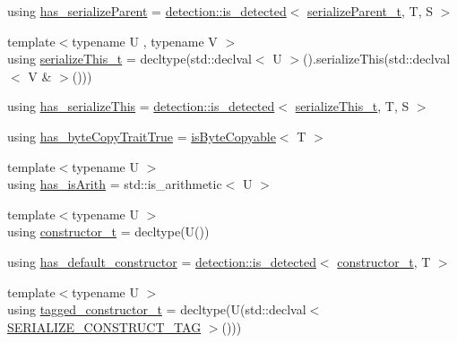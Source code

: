 \begin{DoxyCompactItemize}
\item 
using \hyperlink{structcheckpoint_1_1_serializable_traits_a4785b7f54369ec889ac5a25a8256a578}{has\+\_\+serialize\+Parent} = \hyperlink{namespacedetection_a30893549a3de1e9603d78dad6d5dce92}{detection\+::is\+\_\+detected}$<$ \hyperlink{structcheckpoint_1_1_serializable_traits_a38585e5b9aa0653c08ff48504e922ad5}{serialize\+Parent\+\_\+t}, T, S $>$
\item 
{\footnotesize template$<$typename U , typename V $>$ }\\using \hyperlink{structcheckpoint_1_1_serializable_traits_ac81eb64532a65d97dc995e582ef708ad}{serialize\+This\+\_\+t} = decltype(std\+::declval$<$ U $>$().serialize\+This(std\+::declval$<$ V \& $>$()))
\item 
using \hyperlink{structcheckpoint_1_1_serializable_traits_adc99520813c22cf61ab70ba2fea3cdc6}{has\+\_\+serialize\+This} = \hyperlink{namespacedetection_a30893549a3de1e9603d78dad6d5dce92}{detection\+::is\+\_\+detected}$<$ \hyperlink{structcheckpoint_1_1_serializable_traits_ac81eb64532a65d97dc995e582ef708ad}{serialize\+This\+\_\+t}, T, S $>$
\item 
using \hyperlink{structcheckpoint_1_1_serializable_traits_a8e42305be1264b105f525ae7dff36c15}{has\+\_\+byte\+Copy\+Trait\+True} = \hyperlink{structcheckpoint_1_1is_byte_copyable}{is\+Byte\+Copyable}$<$ T $>$
\item 
{\footnotesize template$<$typename U $>$ }\\using \hyperlink{structcheckpoint_1_1_serializable_traits_a8a8b20be974e219f4fb39b4346be0536}{has\+\_\+is\+Arith} = std\+::is\+\_\+arithmetic$<$ U $>$
\item 
{\footnotesize template$<$typename U $>$ }\\using \hyperlink{structcheckpoint_1_1_serializable_traits_aa0430155930461d346b90681db234d84}{constructor\+\_\+t} = decltype(U())
\item 
using \hyperlink{structcheckpoint_1_1_serializable_traits_a824afd2953233388cbc3223a82c75df8}{has\+\_\+default\+\_\+constructor} = \hyperlink{namespacedetection_a30893549a3de1e9603d78dad6d5dce92}{detection\+::is\+\_\+detected}$<$ \hyperlink{structcheckpoint_1_1_serializable_traits_aa0430155930461d346b90681db234d84}{constructor\+\_\+t}, T $>$
\item 
{\footnotesize template$<$typename U $>$ }\\using \hyperlink{structcheckpoint_1_1_serializable_traits_a5a1f289a5008468335f22e288a96d861}{tagged\+\_\+constructor\+\_\+t} = decltype(U(std\+::declval$<$ \hyperlink{namespacecheckpoint_a7ff642cff4d72d01a16ab10e9bc363ef}{S\+E\+R\+I\+A\+L\+I\+Z\+E\+\_\+\+C\+O\+N\+S\+T\+R\+U\+C\+T\+\_\+\+T\+AG} $>$()))

\end{DoxyCompactItemize}
